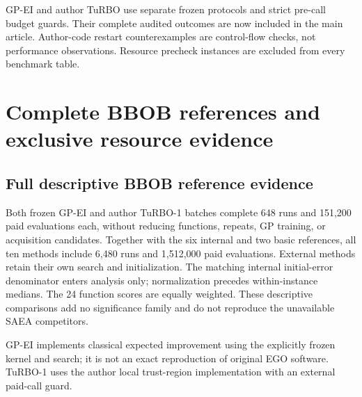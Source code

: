 \documentclass[cmc,article,submit,moreauthors,pdftex]{Definitions/tsp}
\begin{document}
GP-EI and author TuRBO use separate frozen protocols and strict pre-call budget guards. Their complete audited outcomes are now included in the main article. Author-code restart counterexamples are control-flow checks, not performance observations. Resource precheck instances are excluded from every benchmark table.

\hypertarget{complete-bbob-references-and-exclusive-resource-evidence}{%
\section{Complete BBOB references and exclusive resource evidence}\label{complete-bbob-references-and-exclusive-resource-evidence}}

\hypertarget{full-descriptive-bbob-reference-evidence}{%
\subsection{Full descriptive BBOB reference evidence}\label{full-descriptive-bbob-reference-evidence}}

Both frozen GP-EI and author TuRBO-1 batches complete 648 runs and 151,200 paid evaluations each, without reducing functions, repeats, GP training, or acquisition candidates. Together with the six internal and two basic references, all ten methods include 6,480 runs and 1,512,000 paid evaluations. External methods retain their own search and initialization. The matching internal initial-error denominator enters analysis only; normalization precedes within-instance medians. The 24 function scores are equally weighted. These descriptive comparisons add no significance family and do not reproduce the unavailable SAEA competitors.

GP-EI implements classical expected improvement \cite{ref-3} using the explicitly frozen kernel and search; it is not an exact reproduction of original EGO software. TuRBO-1 uses the author local trust-region implementation \cite{ref-25} with an external paid-call guard.
\end{document}
